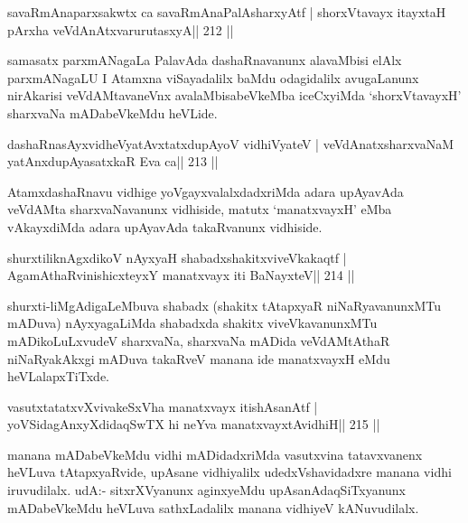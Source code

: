 
\begin{shl}
savaRmAnaparxsakwtx ca savaRmAnaPalAsharxyAtf |
shorxVtavayx itayxtaH pArxha veVdAnAtxvarurutasxyA\hfill || 212 ||
\end{shl}

\begin{artha}
samasatx parxmANagaLa PalavAda dashaRnavanunx alavaMbisi elAlx parxmANagaLU I Atamxna viSayadalilx baMdu odagidalilx avugaLanunx nirAkarisi veVdAMtavaneVnx avalaMbisabeVkeMba iceCxyiMda `shorxVtavayxH' sharxvaNa mADabeVkeMdu heVLide.
\end{artha}

\begin{shl}
dashaRnasAyxvidheVyatAvxtatxdupAyoV vidhiVyateV |
veVdAnatxsharxvaNaM yatAnxdupAyasatxkaR Eva ca\hfill || 213 ||
\end{shl}

\begin{artha}
AtamxdashaRnavu vidhige yoVgayxvalalxdadxriMda adara upAyavAda veVdAMta sharxvaNavanunx vidhiside, matutx `manatxvayxH' eMba vAkayxdiMda adara upAyavAda takaRvanunx vidhiside.
\end{artha}


\begin{shl}
shurxtiliknAgxdikoV nAyxyaH shabadxshakitxviveVkakaqtf |
AgamAthaRvinishicxteyxY manatxvayx iti BaNayxteV\hfill || 214 ||
\end{shl}

\begin{artha}
shurxti-liMgAdigaLeMbuva shabadx (shakitx tAtapxyaR niNaRyavanunxMTu mADuva) nAyxyagaLiMda shabadxda shakitx viveVkavanunxMTu mADikoLuLxvudeV sharxvaNa, sharxvaNa mADida veVdAMtAthaR niNaRyakAkxgi mADuva takaRveV manana ide manatxvayxH eMdu heVLalapxTiTxde.
\end{artha}


\begin{shl}
vasutxtatatxvXvivakeSxVha manatxvayx itishAsanAtf |
yoVSidagAnxyXdidaqSwTX hi neYva manatxvayxtAvidhiH\hfill || 215 ||
\end{shl}

\begin{artha}
manana mADabeVkeMdu vidhi mADidadxriMda vasutxvina tatavxvanenx heVLuva tAtapxyaRvide, upAsane vidhiyalilx udedxVshavidadxre manana vidhi iruvudilalx. udA:- sitxrXVyanunx aginxyeMdu upAsanAdaqSiTxyanunx mADabeVkeMdu heVLuva sathxLadalilx manana vidhiyeV kANuvudilalx.
\end{artha}

